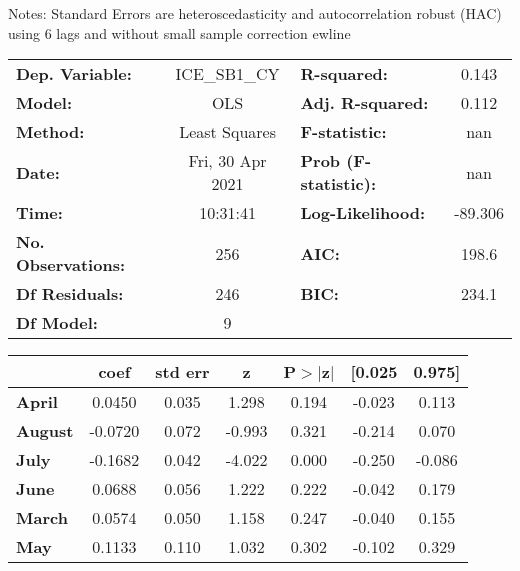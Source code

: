 Notes: \newline
 [1] Standard Errors are heteroscedasticity and autocorrelation robust (HAC) using 6 lags and without small sample correction
ewline\begin{center}
\begin{tabular}{lclc}
\toprule
\textbf{Dep. Variable:}    &   ICE\_SB1\_CY   & \textbf{  R-squared:         } &     0.143   \\
\textbf{Model:}            &       OLS        & \textbf{  Adj. R-squared:    } &     0.112   \\
\textbf{Method:}           &  Least Squares   & \textbf{  F-statistic:       } &       nan   \\
\textbf{Date:}             & Fri, 30 Apr 2021 & \textbf{  Prob (F-statistic):} &      nan    \\
\textbf{Time:}             &     10:31:41     & \textbf{  Log-Likelihood:    } &   -89.306   \\
\textbf{No. Observations:} &         256      & \textbf{  AIC:               } &     198.6   \\
\textbf{Df Residuals:}     &         246      & \textbf{  BIC:               } &     234.1   \\
\textbf{Df Model:}         &           9      & \textbf{                     } &             \\
\bottomrule
\end{tabular}
\begin{tabular}{lcccccc}
                   & \textbf{coef} & \textbf{std err} & \textbf{z} & \textbf{P$> |$z$|$} & \textbf{[0.025} & \textbf{0.975]}  \\
\midrule
\textbf{April}     &       0.0450  &        0.035     &     1.298  &         0.194        &       -0.023    &        0.113     \\
\textbf{August}    &      -0.0720  &        0.072     &    -0.993  &         0.321        &       -0.214    &        0.070     \\
\textbf{July}      &      -0.1682  &        0.042     &    -4.022  &         0.000        &       -0.250    &       -0.086     \\
\textbf{June}      &       0.0688  &        0.056     &     1.222  &         0.222        &       -0.042    &        0.179     \\
\textbf{March}     &       0.0574  &        0.050     &     1.158  &         0.247        &       -0.040    &        0.155     \\
\textbf{May}       &       0.1133  &        0.110     &     1.032  &         0.302        &       -0.102    &        0.329     \\

\end{tabular}
\end{center}
